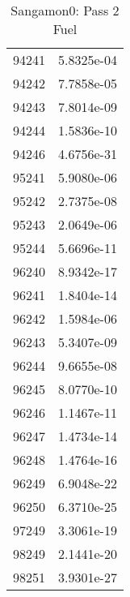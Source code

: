\begin{table}[h!]
\begin{tabular}{|| c || c |}
94241 & 5.8325e-04 \\
94242 & 7.7858e-05 \\
94243 & 7.8014e-09 \\
94244 & 1.5836e-10 \\
94246 & 4.6756e-31 \\
95241 & 5.9080e-06 \\
95242 & 2.7375e-08 \\
95243 & 2.0649e-06 \\
95244 & 5.6696e-11 \\
96240 & 8.9342e-17 \\
96241 & 1.8404e-14 \\
96242 & 1.5984e-06 \\
96243 & 5.3407e-09 \\
96244 & 9.6655e-08 \\
96245 & 8.0770e-10 \\
96246 & 1.1467e-11 \\
96247 & 1.4734e-14 \\
96248 & 1.4764e-16 \\
96249 & 6.9048e-22 \\
96250 & 6.3710e-25 \\
97249 & 3.3061e-19 \\
98249 & 2.1441e-20 \\
98251 & 3.9301e-27 \\

\hline
\end{tabular}
\caption{Sangamon0: Pass 2 Fuel}
\label{table:sang0p2fuel}
\end{table}